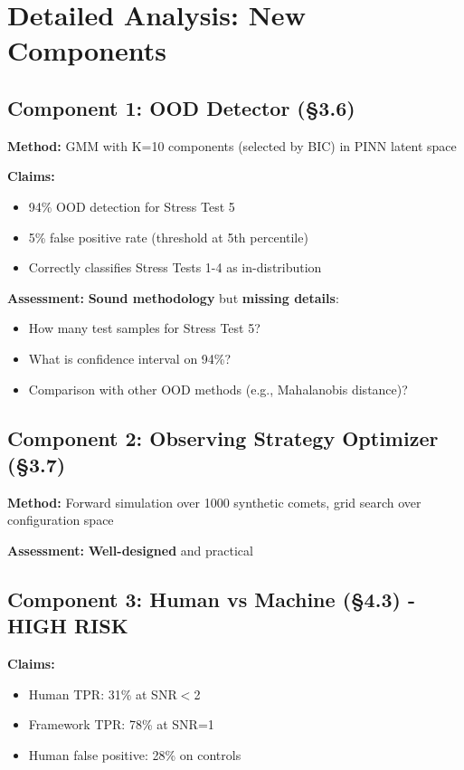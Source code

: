 \documentclass[12pt,a4paper]{article}
\newcommand{\warning}[1]{\textcolor{WarningOrange}{\textbf{#1}}}
\newcommand{\good}[1]{\textcolor{GoodGreen}{\textbf{#1}}}
\newcommand{\excellent}[1]{\textcolor{ExcellentGreen}{\textbf{#1}}}
\begin{document}
\section{Detailed Analysis: New Components}

\subsection{Component 1: OOD Detector (\S3.6)}

\textbf{Method:} GMM with K=10 components (selected by BIC) in PINN latent space

\textbf{Claims:}
\begin{itemize}
\item 94\% OOD detection for Stress Test 5
\item 5\% false positive rate (threshold at 5th percentile)
\item Correctly classifies Stress Tests 1-4 as in-distribution
\end{itemize}

\textbf{Assessment:} \good{Sound methodology} but \warning{missing details}:
\begin{itemize}
\item How many test samples for Stress Test 5?
\item What is confidence interval on 94\%?
\item Comparison with other OOD methods (e.g., Mahalanobis distance)?
\end{itemize}

\subsection{Component 2: Observing Strategy Optimizer (\S3.7)}

\textbf{Method:} Forward simulation over 1000 synthetic comets, grid search over configuration space

\textbf{Assessment:} \excellent{Well-designed} and practical

\subsection{Component 3: Human vs Machine (\S4.3) - HIGH RISK}

\textbf{Claims:}
\begin{itemize}
\item Human TPR: 31\% at SNR$<$2
\item Framework TPR: 78\% at SNR=1
\item Human false positive: 28\% on controls
\end{itemize}
\end{document}
